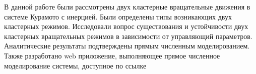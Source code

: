 В данной работе были рассмотрены двух
    кластерные вращательные движения 
    в системе Курамото с инерцией.
    Были определены типы возникающих двух кластерных
    режимов. 
    Исследовали вопрос существования и
    устойчивости двух кластерных вращательных
    режимов в зависимости от управляющий параметров.
    Аналитические результаты подтверждены прямым численным 
    моделированием.
    Также разработано web приложение, выполняющее
    прямое численное моделирование системы, доступное по ссылке
